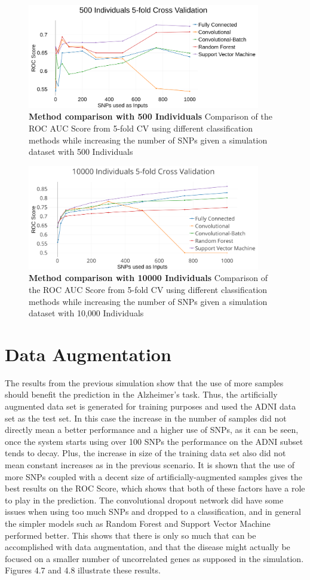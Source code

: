 \begin{figure}[!ht]
\centerline{\includegraphics[width=4in]{images/results/Sim500.png}}
\caption{{\bf Method comparison with 500 Individuals}
Comparison of the ROC AUC Score from 5-fold CV using different classification methods while increasing the number of SNPs given a simulation dataset with 500 Individuals}
\label{fig8}
\end{figure}

\begin{figure}[!ht]
\centerline{\includegraphics[width=4in]{images/results/Sim10000.png}}
\caption{{\bf Method comparison with 10000 Individuals}
Comparison of the ROC AUC Score from 5-fold CV using different classification methods while increasing the number of SNPs given a simulation dataset with 10,000 Individuals}
\label{fig9}
\end{figure}
\clearpage
\section{Data Augmentation}

The results from the previous simulation show that the use of more samples should benefit the prediction in the Alzheimer's task. Thus,  the artificially augmented data set is generated for training purposes and used the ADNI data set as the test set. In this case the increase in the number of samples did not directly mean a better performance and a higher use of SNPs, as it can be seen, once the system starts using over 100 SNPs the performance on the ADNI subset tends to decay. Plus, the increase in size of the training data set also did not mean constant increases as in the previous scenario. It is shown that the use of more SNPs coupled with a decent size of artificially-augmented samples gives the best results on the ROC Score, which shows that both of these factors have a role to play in the prediction. The convolutional dropout network did have some issues when using too much SNPs and dropped to a classification, and in general the simpler models such as Random Forest and Support Vector Machine performed better. This shows that there is only so much that can be accomplished with data augmentation, and that the disease might actually be focused on a smaller number of uncorrelated genes as supposed in the simulation. Figures 4.7 and 4.8 illustrate these results.

